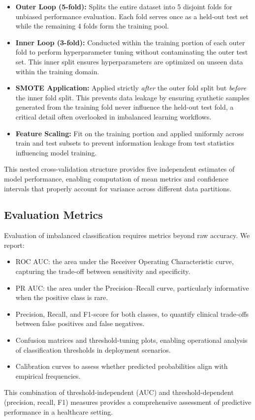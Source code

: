 \begin{itemize}
    \item \textbf{Outer Loop (5-fold):} Splits the entire dataset into 5 disjoint folds for unbiased performance evaluation. Each fold serves once as a held-out test set while the remaining 4 folds form the training pool.
    
    \item \textbf{Inner Loop (3-fold):} Conducted within the training portion of each outer fold to perform hyperparameter tuning without contaminating the outer test set. This inner split ensures hyperparameters are optimized on unseen data within the training domain.
    
    \item \textbf{SMOTE Application:} Applied strictly \emph{after} the outer fold split but \emph{before} the inner fold split. This prevents data leakage by ensuring synthetic samples generated from the training fold never influence the held-out test fold, a critical detail often overlooked in imbalanced learning workflows.
    
    \item \textbf{Feature Scaling:} Fit on the training portion and applied uniformly across train and test subsets to prevent information leakage from test statistics influencing model training.
\end{itemize}

This nested cross-validation structure provides five independent estimates of model performance, enabling computation of mean metrics and confidence intervals that properly account for variance across different data partitions.

\subsection{Evaluation Metrics}
Evaluation of imbalanced classification requires metrics beyond raw accuracy. We report:
\begin{itemize}
    \item ROC AUC: the area under the Receiver Operating Characteristic curve, capturing the trade-off between sensitivity and specificity.
    \item PR AUC: the area under the Precision–Recall curve, particularly informative when the positive class is rare.
    \item Precision, Recall, and F1-score for both classes, to quantify clinical trade-offs between false positives and false negatives.
    \item Confusion matrices and threshold-tuning plots, enabling operational analysis of classification thresholds in deployment scenarios.
    \item Calibration curves to assess whether predicted probabilities align with empirical frequencies.
\end{itemize}
This combination of threshold-independent (AUC) and threshold-dependent (precision, recall, F1) measures provides a comprehensive assessment of predictive performance in a healthcare setting.

